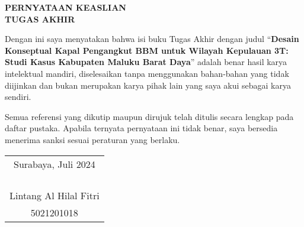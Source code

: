 \begin{center}
  \large
  \textbf{PERNYATAAN KEASLIAN\\TUGAS AKHIR}
\end{center}

\thispagestyle{empty}
\vspace{2ex}

Dengan ini saya menyatakan bahwa isi buku Tugas Akhir dengan judul
``\textbf{Desain Konseptual Kapal Pengangkut BBM untuk Wilayah Kepulauan 3T: Studi Kasus Kabupaten Maluku Barat Daya}''
adalah benar hasil karya intelektual mandiri, diselesaikan tanpa menggunakan bahan-bahan yang tidak diijinkan dan bukan merupakan karya pihak lain yang saya akui sebagai karya sendiri.

Semua referensi yang dikutip maupun dirujuk telah ditulis secara lengkap pada daftar pustaka.
Apabila ternyata pernyataan ini tidak benar, saya bersedia menerima sanksi sesuai peraturan yang berlaku.

\vspace{4ex}

\begin{flushright}
  \begin{tabular}[b]{c}
    Surabaya, Juli 2024\\
    \\
    \\
    \\
    \\
    Lintang Al Hilal Fitri\\
    5021201018
  \end{tabular}
\end{flushright}
